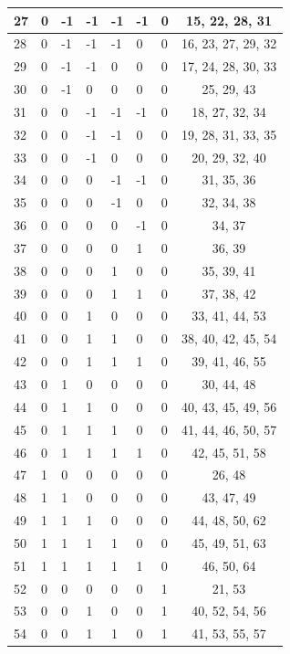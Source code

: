 \begin{longtable}{|l|l|l|l|l|l|l|c|}
27 & 0 & -1 & -1 & -1 & -1 & 0 & 15, 22, 28, 31 \\ \hline
28 & 0 & -1 & -1 & -1 & 0 & 0 & 16, 23, 27, 29, 32 \\ \hline
29 & 0 & -1 & -1 & 0 & 0 & 0 & 17, 24, 28, 30, 33 \\ \hline
30 & 0 & -1 & 0 & 0 & 0 & 0 & 25, 29, 43 \\ \hline
31 & 0 & 0 & -1 & -1 & -1 & 0 & 18, 27, 32, 34 \\ \hline
32 & 0 & 0 & -1 & -1 & 0 & 0 & 19, 28, 31, 33, 35 \\ \hline
33 & 0 & 0 & -1 & 0 & 0 & 0 & 20, 29, 32, 40 \\ \hline
34 & 0 & 0 & 0 & -1 & -1 & 0 & 31, 35, 36 \\ \hline
35 & 0 & 0 & 0 & -1 & 0 & 0 & 32, 34, 38 \\ \hline
36 & 0 & 0 & 0 & 0 & -1 & 0 & 34, 37 \\ \hline
37 & 0 & 0 & 0 & 0 & 1 & 0 & 36, 39 \\ \hline
38 & 0 & 0 & 0 & 1 & 0 & 0 & 35, 39, 41 \\ \hline
39 & 0 & 0 & 0 & 1 & 1 & 0 & 37, 38, 42 \\ \hline
40 & 0 & 0 & 1 & 0 & 0 & 0 & 33, 41, 44, 53 \\ \hline
41 & 0 & 0 & 1 & 1 & 0 & 0 & 38, 40, 42, 45, 54 \\ \hline
42 & 0 & 0 & 1 & 1 & 1 & 0 & 39, 41, 46, 55 \\ \hline
43 & 0 & 1 & 0 & 0 & 0 & 0 & 30, 44, 48 \\ \hline
44 & 0 & 1 & 1 & 0 & 0 & 0 & 40, 43, 45, 49, 56 \\ \hline
45 & 0 & 1 & 1 & 1 & 0 & 0 & 41, 44, 46, 50, 57 \\ \hline
46 & 0 & 1 & 1 & 1 & 1 & 0 & 42, 45, 51, 58 \\ \hline
47 & 1 & 0 & 0 & 0 & 0 & 0 & 26, 48 \\ \hline
48 & 1 & 1 & 0 & 0 & 0 & 0 & 43, 47, 49 \\ \hline
49 & 1 & 1 & 1 & 0 & 0 & 0 & 44, 48, 50, 62 \\ \hline
50 & 1 & 1 & 1 & 1 & 0 & 0 & 45, 49, 51, 63 \\ \hline
51 & 1 & 1 & 1 & 1 & 1 & 0 & 46, 50, 64 \\ \hline
52 & 0 & 0 & 0 & 0 & 0 & 1 & 21, 53 \\ \hline
53 & 0 & 0 & 1 & 0 & 0 & 1 & 40, 52, 54, 56 \\ \hline
54 & 0 & 0 & 1 & 1 & 0 & 1 & 41, 53, 55, 57 \\ \hline

\end{longtable}
